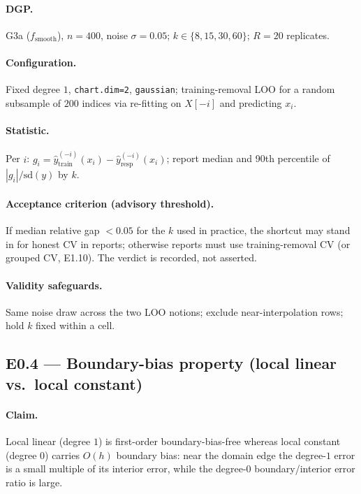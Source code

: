 \documentclass[11pt]{article}
\newcommand{\code}[1]{\texttt{#1}}
\begin{document}
\paragraph{DGP.} G3a ($f_{\mathrm{smooth}}$), $n=400$, noise $\sigma=0.05$; $k\in\{8,15,30,60\}$;
$R=20$ replicates.

\paragraph{Configuration.} Fixed degree $1$, \code{chart.dim=2}, \code{gaussian};
training-removal LOO for a random subsample of $200$ indices via re-fitting on $X[-i]$ and
predicting $x_i$.

\paragraph{Statistic.} Per $i$: $g_i=\hat y^{(-i)}_{\mathrm{train}}(x_i)-\hat y^{(-i)}_{\mathrm{resp}}(x_i)$;
report median and 90th percentile of $|g_i|/\mathrm{sd}(y)$ by $k$.

\paragraph{Acceptance criterion (advisory threshold).} If median relative gap $<0.05$ for the
$k$ used in practice, the shortcut may stand in for honest CV in reports; otherwise reports
must use training-removal CV (or grouped CV, E1.10). The verdict is recorded, not asserted.

\paragraph{Validity safeguards.} Same noise draw across the two LOO notions; exclude
near-interpolation rows; hold $k$ fixed within a cell.

\subsection{E0.4 — Boundary-bias property (local linear vs.\ local constant)}

\paragraph{Claim.} Local linear (degree $1$) is first-order boundary-bias-free whereas local
constant (degree $0$) carries $O(h)$ boundary bias: near the domain edge the degree-$1$ error
is a small multiple of its interior error, while the degree-$0$ boundary/interior error ratio
is large.
\end{document}
